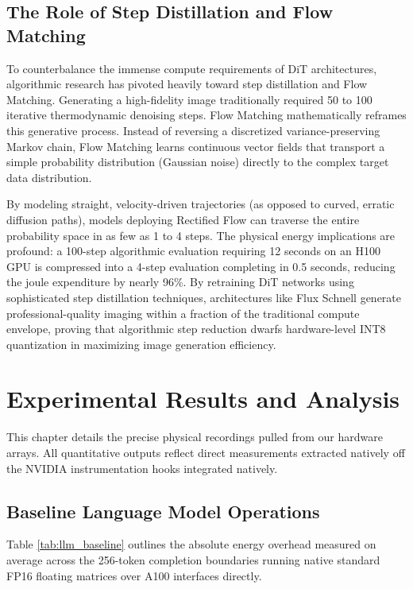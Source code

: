 \documentclass[12pt, a4paper]{report}
\begin{document}
\section{The Role of Step Distillation and Flow Matching}
To counterbalance the immense compute requirements of DiT architectures, algorithmic research has pivoted heavily toward step distillation and Flow Matching. Generating a high-fidelity image traditionally required 50 to 100 iterative thermodynamic denoising steps. Flow Matching mathematically reframes this generative process. Instead of reversing a discretized variance-preserving Markov chain, Flow Matching learns continuous vector fields that transport a simple probability distribution (Gaussian noise) directly to the complex target data distribution.

By modeling straight, velocity-driven trajectories (as opposed to curved, erratic diffusion paths), models deploying Rectified Flow can traverse the entire probability space in as few as 1 to 4 steps. The physical energy implications are profound: a 100-step algorithmic evaluation requiring 12 seconds on an H100 GPU is compressed into a 4-step evaluation completing in 0.5 seconds, reducing the joule expenditure by nearly 96\%. By retraining DiT networks using sophisticated step distillation techniques, architectures like Flux Schnell generate professional-quality imaging within a fraction of the traditional compute envelope, proving that algorithmic step reduction dwarfs hardware-level INT8 quantization in maximizing image generation efficiency.


\chapter{Experimental Results and Analysis}
\label{ch:results}

This chapter details the precise physical recordings pulled from our hardware arrays. All quantitative outputs reflect direct measurements extracted natively off the NVIDIA instrumentation hooks integrated natively.

\section{Baseline Language Model Operations}
Table \ref{tab:llm_baseline} outlines the absolute energy overhead measured on average across the 256-token completion boundaries running native standard FP16 floating matrices over A100 interfaces directly.
\end{document}
